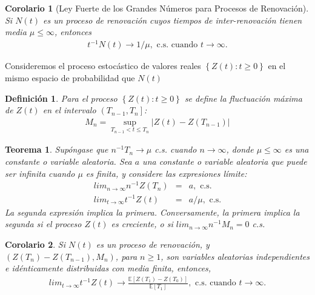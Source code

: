 \documentclass{article}
\newtheorem{Def}{Definición}[section]
\newtheorem{Teo}{Teorema}[section]
\newtheorem{Cor}{Corolario}[section]
\newcommand{\esp}{\mathbb{E}}
\numberwithin{equation}{section}
\begin{document}
\begin{Cor}[Ley Fuerte de los Grandes N\'umeros para Procesos de Renovaci\'on]
Si $N\left(t\right)$ es un proceso de renovaci\'on cuyos tiempos de inter-renovaci\'on tienen media $\mu\leq\infty$, entonces
\begin{eqnarray}
t^{-1}N\left(t\right)\rightarrow 1/\mu,\textrm{ c.s. cuando }t\rightarrow\infty.
\end{eqnarray}
\end{Cor}

Consideremos el proceso estoc\'astico de valores reales $\left\{Z\left(t\right):t\geq0\right\}$ en el mismo espacio de probabilidad que $N\left(t\right)$

\begin{Def}
Para el proceso $\left\{Z\left(t\right):t\geq0\right\}$ se define la fluctuaci\'on m\'axima de $Z\left(t\right)$ en el intervalo $\left(T_{n-1},T_{n}\right]$:
\begin{eqnarray*}
M_{n}=\sup_{T_{n-1}<t\leq T_{n}}|Z\left(t\right)-Z\left(T_{n-1}\right)|
\end{eqnarray*}
\end{Def}

\begin{Teo}
Sup\'ongase que $n^{-1}T_{n}\rightarrow\mu$ c.s. cuando $n\rightarrow\infty$, donde $\mu\leq\infty$ es una constante o variable aleatoria. Sea $a$ una constante o variable aleatoria que puede ser infinita cuando $\mu$ es finita, y considere las expresiones l\'imite:
\begin{eqnarray}
lim_{n\rightarrow\infty}n^{-1}Z\left(T_{n}\right)&=&a,\textrm{ c.s.}\\
lim_{t\rightarrow\infty}t^{-1}Z\left(t\right)&=&a/\mu,\textrm{ c.s.}
\end{eqnarray}
La segunda expresi\'on implica la primera. Conversamente, la primera implica la segunda si el proceso $Z\left(t\right)$ es creciente, o si $lim_{n\rightarrow\infty}n^{-1}M_{n}=0$ c.s.
\end{Teo}

\begin{Cor}
Si $N\left(t\right)$ es un proceso de renovaci\'on, y $\left(Z\left(T_{n}\right)-Z\left(T_{n-1}\right),M_{n}\right)$, para $n\geq1$, son variables aleatorias independientes e id\'enticamente distribuidas con media finita, entonces,
\begin{eqnarray}
lim_{t\rightarrow\infty}t^{-1}Z\left(t\right)\rightarrow\frac{\esp\left[Z\left(T_{1}\right)-Z\left(T_{0}\right)\right]}{\esp\left[T_{1}\right]},\textrm{ c.s. cuando  }t\rightarrow\infty.
\end{eqnarray}
\end{Cor}
\end{document}
